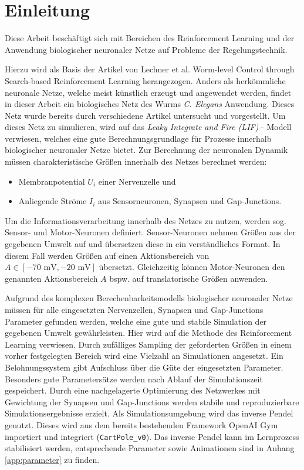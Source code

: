 %
\chapter{Einleitung}
\label{chap:einleitung}
%

	Diese Arbeit beschäftigt sich mit Bereichen des Reinforcement Learning und der Anwendung biologischer neuronaler Netze auf Probleme der Regelungstechnik. 
	
	Hierzu wird als Basis der Artikel von Lechner et al. \glqq Worm-level Control through Search-based Reinforcement Learning\grqq{} \cite{WormLevelRL} herangezogen. Anders als herkömmliche neuronale Netze, welche meist künstlich erzeugt und angewendet werden, findet in dieser Arbeit ein biologisches Netz des Wurms \textit{C. Elegans} Anwendung. Dieses Netz wurde bereits durch verschiedene Artikel \cite{CElegans} \cite{SimCE} \cite{Wicks1996} untersucht und vorgestellt. Um dieses Netz zu simulieren, wird auf das \textit{Leaky Integrate and Fire (LIF)} -  Modell verwiesen, welches eine gute Berechnungsgrundlage für Prozesse innerhalb biologischer neuronaler Netze bietet. Zur Berechnung der neuronalen Dynamik müssen charakteristische Größen innerhalb des Netzes berechnet werden:
	\begin{itemize}
		\item Membranpotential $U_i$ einer Nervenzelle und
		\item Anliegende Ströme $I_i$ aus Sensorneuronen, Synapsen und Gap-Junctions.
	\end{itemize}
	Um die Informationsverarbeitung innerhalb des Netzes zu nutzen, werden sog. Sensor- und Motor-Neuronen definiert. Sensor-Neuronen nehmen Größen aus der gegebenen Umwelt auf und übersetzen diese in ein verständliches Format. In diesem Fall werden Größen auf einen Aktionsbereich von $A \in [-70\text{ mV}, -20\text{ mV}]$ übersetzt. Gleichzeitig können Motor-Neuronen den genannten Aktionsbereich $A$ bspw. auf translatorische Größen anwenden.
	
	Aufgrund des komplexen Berechenbarkeitsmodells biologischer neuronaler Netze müssen für alle eingesetzten Nervenzellen, Synapsen und Gap-Junctions Parameter gefunden werden, welche eine gute und stabile Simulation der gegebenen Umwelt gewährleisten. Hier wird auf die Methode des Reinforcement Learning verwiesen. Durch zufälliges Sampling der geforderten Größen in einem vorher festgelegten Bereich wird eine Vielzahl an Simulationen angesetzt. Ein Belohnungssystem gibt Aufschluss über die Güte der eingesetzten Parameter. Besonders gute Parametersätze werden nach Ablauf der Simulationszeit gespeichert. Durch eine nachgelagerte Optimierung des Netzwerkes mit Gewichtung der Synapsen und Gap-Junctions werden stabile und reproduzierbare Simulationsergebnisse erzielt. Als Simulationsumgebung wird das inverse Pendel genutzt. Dieses wird aus dem bereits bestehenden Framework OpenAI Gym importiert und integriert (\texttt{CartPole\_v0}). Das inverse Pendel kann im Lernprozess stabilisiert werden, entsprechende Parameter sowie Animationen sind in Anhang \ref{app:parameter} zu finden.

